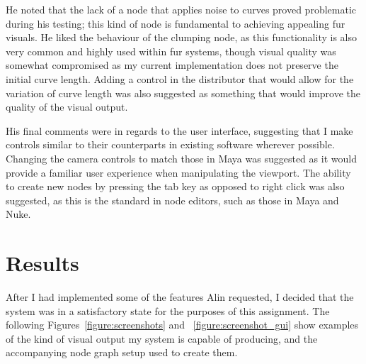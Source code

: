 \documentclass[]{acmsiggraph}
\begin{document}
He noted that the lack of a node that applies noise to curves proved problematic during his testing; this kind of node is fundamental to achieving appealing fur visuals. He liked the behaviour of the clumping node, as this functionality is also very common and highly used within fur systems, though visual quality was somewhat compromised as my current implementation does not preserve the initial curve length. Adding a control in the distributor that would allow for the variation of curve length was also suggested as something that would improve the quality of the visual output.

His final comments were in regards to the user interface, suggesting that I make controls similar to their counterparts in existing software wherever possible. Changing the camera controls to match those in Maya was suggested as it would provide a familiar user experience when manipulating the viewport. The ability to create new nodes by pressing the tab key as opposed to right click was also suggested, as this is the standard in node editors, such as those in Maya and Nuke.

\section{Results} \label{sec:results}

After I had implemented some of the features Alin requested, I decided that the system was in a satisfactory state for the purposes of this assignment. The following Figures~\ref{figure:screenshots} and ~\ref{figure:screenshot_gui} show examples of the kind of visual output my system is capable of producing, and the accompanying node graph setup used to create them.
\end{document}
